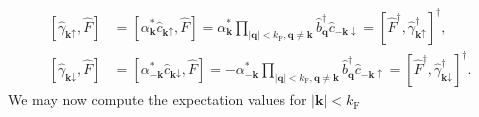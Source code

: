 \documentclass[english, parskip=full]{scrartcl}
\newcommand{\klam}{}
\newcommand{\tecxt}{}
\begin{document}
\begin{align}
\klam\left[ \hat{\gamma}_{\textbf{k}\uparrow}, \hat{F} \right] &= \klam\left[ \alpha_\textbf{k}^\ast \hat{c}_{\textbf{k}\uparrow}, \hat{F} \right] = \alpha_\textbf{k}^\ast \prod_{|\textbf{q}| < k_\tecxt\text{F}, \textbf{q}\neq \textbf{k}} \hat{b}_{\textbf{q}}^\dagger \hat{c}_{-\textbf{k}\downarrow} = \klam\left[ \hat{F}^\dagger, \hat{\gamma}_{\textbf{k}\uparrow}^\dagger \right]^\dagger,\\
\klam\left[ \hat{\gamma}_{\textbf{k}\downarrow}, \hat{F} \right] &= \klam\left[ \alpha_{-\textbf{k}}^\ast \hat{c}_{\textbf{k}\downarrow}, \hat{F} \right] = -\alpha_{-\textbf{k}}^\ast \prod_{|\textbf{q}| < k_\tecxt\text{F}, \textbf{q}\neq \textbf{k}} \hat{b}_{\textbf{q}}^\dagger \hat{c}_{-\textbf{k}\uparrow} = \klam\left[ \hat{F}^\dagger, \hat{\gamma}_{\textbf{k}\downarrow}^\dagger \right]^\dagger .
\end{align}
We may now compute the expectation values for $|\textbf{k}| < k_\tecxt\text{F}$
\end{document}
